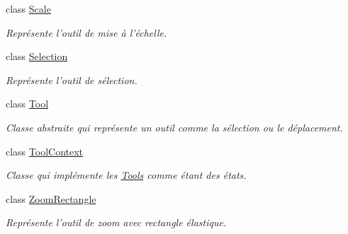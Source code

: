 \begin{DoxyCompactItemize}
class \hyperlink{class_interface_graphique_1_1_tools_1_1_scale}{Scale}
\begin{DoxyCompactList}\small\item\em Représente l'outil de mise à l'échelle. \end{DoxyCompactList}\item 
class \hyperlink{class_interface_graphique_1_1_tools_1_1_selection}{Selection}
\begin{DoxyCompactList}\small\item\em Représente l'outil de sélection. \end{DoxyCompactList}\item 
class \hyperlink{class_interface_graphique_1_1_tools_1_1_tool}{Tool}
\begin{DoxyCompactList}\small\item\em Classe abstraite qui représente un outil comme la sélection ou le déplacement. \end{DoxyCompactList}\item 
class \hyperlink{class_interface_graphique_1_1_tools_1_1_tool_context}{Tool\-Context}
\begin{DoxyCompactList}\small\item\em Classe qui implémente les \hyperlink{namespace_interface_graphique_1_1_tools}{Tools} comme étant des états. \end{DoxyCompactList}\item 
class \hyperlink{class_interface_graphique_1_1_tools_1_1_zoom_rectangle}{Zoom\-Rectangle}
\begin{DoxyCompactList}\small\item\em Représente l'outil de zoom avec rectangle élastique. \end{DoxyCompactList}\end{DoxyCompactItemize}
